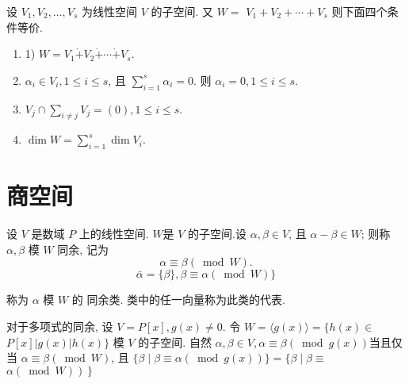 \documentclass{ctexart}
\begin{document}
\begin{theorem}
     设 $V_1, V_2, \ldots, V_s$ 为线性空间 $V$ 的子空间. 又 $W=$ $V_1+V_2+\cdots+V_s$ 则下面四个条件等价.
     \begin{enumerate}
         \item 1) $W=V_1 \dot{+} V_2 \dot{+} \cdots \dot{+} V_s$.
         \item $\alpha_i \in V_i, 1 \leq i \leq s$, 且 $\sum_{i=1}^s \alpha_i=0$. 则 $\alpha_i=0,1 \leq i \leq s$.
         \item $V_j \cap \sum_{i \neq j} V_j=(0), 1 \leq i \leq s$.
         \item  $\operatorname{dim} W=\sum_{i=1}^s \operatorname{dim} V_i$.
     \end{enumerate}
\end{theorem}

\section{商空间}

\begin{definition}[商空间]
设 $V$ 是数域 $P$ 上的线性空间. $W$是 $V$ 的子空间.设 $\alpha, \beta \in V$, 且 $\alpha-\beta \in W$; 则称 $\alpha, \beta$ 模 $W$ 同余, 记为
$$
\alpha \equiv \beta(\bmod W) .
$$
$$
\bar{\alpha}=\{\beta\}, \beta \equiv \alpha(\bmod W)\}
$$

称为 $\alpha$ 模 $W$ 的 同余类. 类中的任一向量称为此类的代表.
\end{definition}

\begin{example}[多项式同余]
    对于多项式的同余, 
    设 $V={P}[x], g(x) \neq 0$. 令 $W=\langle g(x)\rangle=\{h(x) \in$ ${P}[x]|g(x)| h(x)\}$ 模 $V$ 的子空间. 自然 $\alpha, \beta \in V, \alpha \equiv \beta(\bmod g(x))$当且仅当 $\alpha \equiv \beta\left(\bmod W\right)$, 且 $\{\beta \mid \beta \equiv \alpha(\bmod g(x))\}=\{\beta \mid \beta \equiv$ $\left.\left.\alpha(\bmod W)\right)\right\}$
\end{example}
\end{document}
